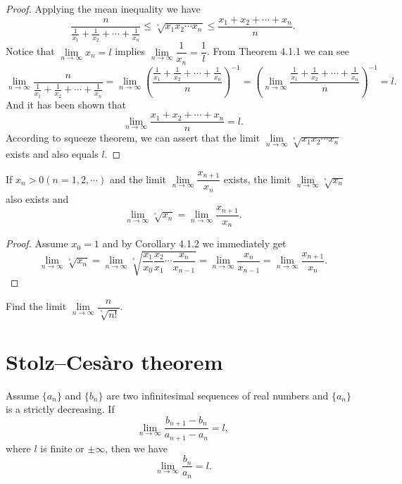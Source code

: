 \documentclass[11pt,fleqn]{book} %
\begin{document}
\begin{proof}
	Applying the mean inequality we have
    \[
    \frac{n}{\frac{1}{x_1}+\frac{1}{x_2}+\cdots+\frac{1}{x_n}}\leqslant\sqrt[^n]{x_1x_2\cdots x_n}\leqslant\frac{x_1+x_2+\cdots+x_n}{n}.
    \]
    Notice that $\lim\limits_{n\to\infty}x_n=l$ implies $\lim\limits_{n\to\infty}\dfrac{1}{x_n}=\dfrac{1}{l}$. From Theorem 4.1.1 we can see
    \[
    \lim\limits_{n\to\infty}\frac{n}{\frac{1}{x_1}+\frac{1}{x_2}+\cdots+\frac{1}{x_n}}=\lim\limits_{n\to\infty}\left(\frac{\frac{1}{x_1}+\frac{1}{x_2}+\cdots+\frac{1}{x_n}}{n}\right)^{-1}=\left(\lim\limits_{n\to\infty}\frac{\frac{1}{x_1}+\frac{1}{x_2}+\cdots+\frac{1}{x_n}}{n}\right)^{-1}=l.
    \]
    And it has been shown that
    \[
    \lim\limits_{n\to\infty}\frac{x_1+x_2+\cdots+x_n}{n}=l.
    \]
    According to squeeze theorem, we can assert that the limit $\lim\limits_{n\to\infty}\sqrt[^n]{x_1x_2\cdots x_n}$ exists and also equals $l$.   
\end{proof}

\vspace{3mm}

\begin{proposition}
	If $x_n>0(n=1,2,\cdots)$ and the limit $\lim\limits_{n\to\infty}\dfrac{x_{n+1}}{x_n}$ exists, the limit $\lim\limits_{n\to\infty}\sqrt[^n]{x_n}$ also exists and
	\[
	\lim\limits_{n\to\infty}\sqrt[^n]{x_n}=\lim\limits_{n\to\infty}\frac{x_{n+1}}{x_n}.
	\]
\end{proposition}

\begin{proof}
    Assume $x_0=1$ and by Corollary 4.1.2 we immediately get
	\[
	\lim\limits_{n\to\infty}\sqrt[^n]{x_n}=\lim\limits_{n\to\infty}\sqrt[^n]{\frac{x_1}{x_0}\frac{x_2}{x_1}\cdots\frac{x_{n}}{x_{n-1}}}=\lim\limits_{n\to\infty}\frac{x_n}{x_{n-1}}=\lim\limits_{n\to\infty}\frac{x_{n+1}}{x_n}.
	\]
\end{proof}

\begin{example}
	Find the limit $\lim\limits_{n\to\infty}\dfrac{n}{\sqrt[^n]{n!}}$.
\end{example}

\section{Stolz–Cesàro theorem}

\begin{theorem}
	Assume $\{a_n\}$ and $\{b_n\}$ are two infinitesimal sequences of real numbers and $\{a_n\}$ is a strictly decreasing. If
	\[
		\lim\limits_{n\to\infty}\frac{b_{n+1}-b_n}{a_{n+1}-a_n}=l,
	\]
    where $l$ is finite or $\pm\infty$, then we have
	\[
	    \lim\limits_{n\to\infty}\frac{b_n}{a_n}=l.
	\]
\end{theorem}
\end{document}
